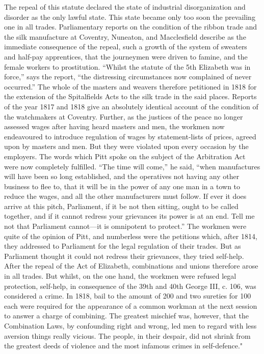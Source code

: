 \documentclass{book}
\begin{document}
The repeal of this statute declared the state of industrial disorganization and disorder as the only lawful state. This state became only too soon the prevailing one in all trades. Parliamentary reports on the condition of the ribbon trade and the silk manufacture at Coventry, Nuneaton, and Macclesfield describe as the immediate consequence of the repeal, such a growth of the system of sweaters and half-pay apprentices, that the journeymen were driven to famine, and the female workers to prostitution. “Whilst the statute of the 5th Elizabeth was in force,” says the report, “the distressing circumstances now complained of never occurred.” The whole of the masters and weavers therefore petitioned in 1818 for the extension of the Spitalfields Acts to the silk trade in the said places. Reports of the year 1817 and 1818 give an absolutely identical account of the condition of the watchmakers at Coventry. Further, as the justices of the peace no longer assessed wages after having heard masters and men, the workmen now endeavoured to introduce regulation of wages by statement-lists of prices, agreed upon by masters and men. But they were violated upon every occasion by the employers. The words which Pitt spoke on the subject of the Arbitration Act were now completely fulfilled. “The time will come,” he said, “when manufactures will have been so long established, and the operatives not having any other business to flee to, that it will be in the power of any one man in a town to reduce the wages, and all the other manufacturers must follow. If ever it does arrive at this pitch, Parliament, if it be not then sitting, ought to be called together, and if it cannot redress your grievances its power is at an end. Tell me not that Parliament cannot—it is omnipotent to protect.” The workmen were quite of the opinion of Pitt, and numberless were the petitions which, after 1814, they addressed to Parliament for the legal regulation of their trades. But as Parliament thought it could not redress their grievances, they tried self-help. After the repeal of the Act of Elizabeth, combinations and unions therefore arose in all trades. But whilst, on the one hand, the workmen were refused legal protection, self-help, in consequence of the 39th and 40th George III, c. 106, was considered a crime. In 1818, bail to the amount of 200 and two sureties for 100 each were required for the appearance of a common workman at the next session to answer a charge of combining. The greatest mischief was, however, that the Combination Laws, by confounding right and wrong, led men to regard with less aversion things really vicious. The people, in their despair, did not shrink from the greatest deeds of violence and the most infamous crimes in self-defence."\footnotemark[8]
\end{document}

